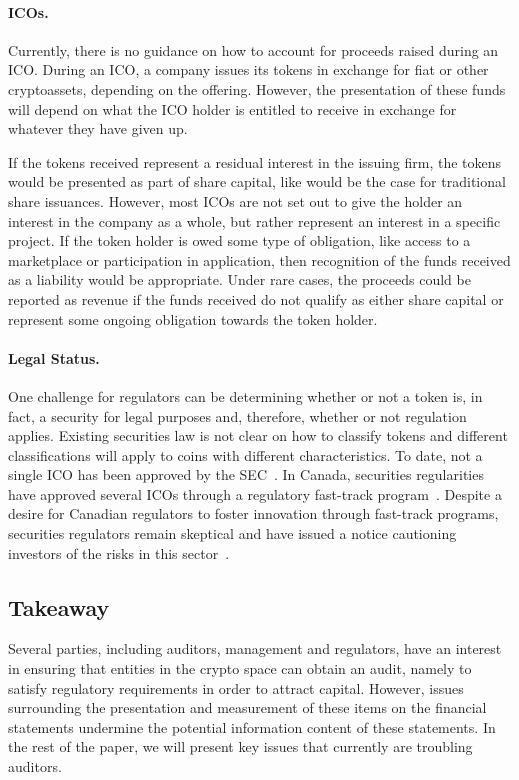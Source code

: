\paragraph{ICOs.} Currently, there is no guidance on how to account for proceeds raised during an ICO. During an ICO, a company issues its tokens in exchange for fiat or other cryptoassets, depending on the offering. However, the presentation of these funds will depend on what the ICO holder is entitled to receive in exchange for whatever they have given up.  

If the tokens received represent a residual interest in the issuing firm, the tokens would be presented as part of share capital, like would be the case for traditional share issuances. However, most ICOs are not set out to give the holder an interest in the company as a whole, but rather represent an interest in a specific project. If the token holder is owed some type of obligation, like access to a marketplace or participation in application, then recognition of the funds received as a liability would be appropriate. Under rare cases, the proceeds could be reported as revenue if the funds received do not qualify as either share capital or represent some ongoing obligation towards the token holder. 


\paragraph{Legal Status.} One challenge for regulators can be determining whether or not a token is, in fact, a security for legal purposes and, therefore, whether or not regulation applies. Existing securities law is not clear on how to classify tokens and different classifications will apply to coins with different characteristics. To date, not a single ICO has been approved by the SEC~\cite{SECICO2017}. In Canada, securities regularities have approved several ICOs through a regulatory fast-track program~\cite{fastTrackICOImpakt}. Despite a desire for Canadian regulators to foster innovation through fast-track programs, securities regulators remain skeptical and have issued a notice cautioning investors of the risks in this sector~\cite{CSAICO2017}. 


\subsection{Takeaway}
Several parties, including auditors, management and regulators, have an interest in ensuring that entities in the crypto space can obtain an audit, namely to satisfy regulatory requirements in order to attract capital. However, issues surrounding the presentation and measurement of these items on the financial statements undermine the potential information content of these statements. In the rest of the paper, we will present key issues that currently are troubling auditors. 

